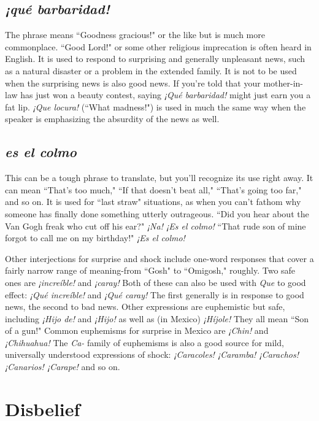 \subsection{\emph{¡qué barbaridad!}}

The phrase means ``Goodness gracious!" or the like but is
much more commonplace. ``Good Lord!" or some other religious imprecation is often heard in English. It is used to respond to surprising
and generally unpleasant news, such as a natural disaster or a problem
in the extended family. It is not to be used when the surprising news is
also good news. If you're told that your mother-in-law has just won a
beauty contest, saying \emph{¡Qué barbaridad!} might just earn you a fat lip.
\emph{¡Que locura!} (``What madness!") is used in much the same way when
the speaker is emphasizing the absurdity of the news as well.

\subsection{\emph{es el colmo}}

This can be a tough phrase to translate, but you'll recognize
its use right away. It can mean ``That's too much," ``If that doesn't beat
all," ``That's going too far," and so on. It is used for ``last straw" situations, as when you can't fathom why someone has finally done something utterly outrageous. ``Did you hear about the Van Gogh freak who
cut off his ear?" \emph{¡Na! ¡Es el colmo!} ``That rude son of mine forgot to
call me on my birthday!" \emph{¡Es el colmo!}

Other interjections for surprise and shock include one-word
responses that cover a fairly narrow range of meaning-from ``Gosh"
to ``Omigosh," roughly. Two safe ones are \emph{¡increíble!} and \emph{¡caray!} Both
of these can also be used with \emph{Que} to good effect: \emph{¡Qué increíble!} and
\emph{¡Qué caray!} The first generally is in response to good news, the second
to bad news. Other expressions are euphemistic but safe, including
\emph{¡Hijo de!} and \emph{¡Hijo!} as well as (in Mexico) \emph{¡Híjole!} They all mean ``Son
of a gun!" Common euphemisms for surprise in Mexico are \emph{¡Chin!} and
\emph{¡Chihuahua!} The \emph{Ca-} family of euphemisms is also a good source for
mild, universally understood expressions of shock: \emph{¡Caracoles! ¡Caramba! ¡Carachos! ¡Canarios! ¡Carape!} and so on.

\section{Disbelief}

